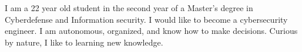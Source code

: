 
\begin{cvparagraph}
I am a 22 year old student in the second year of a Master's degree in Cyberdefense and Information security. 
I would like to become a cybersecurity engineer. I am autonomous, organized, and know how to make decisions. Curious by nature, I like to learning new knowledge.
\end{cvparagraph}
